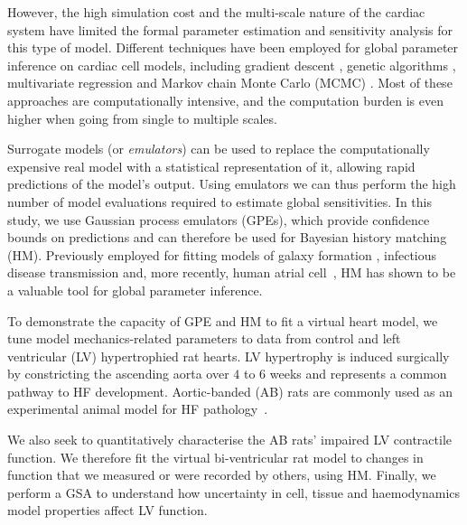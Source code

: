 However, the high simulation cost and the multi-scale nature of the cardiac system have limited the formal parameter estimation and sensitivity analysis for this type of model. Different techniques have been employed for global parameter inference on cardiac cell models, including gradient descent \cite{Dokos:2004}, genetic algorithms \cite{Groenendaal:2015}, multivariate regression \cite{Sarkar:2010} and Markov chain Monte Carlo (MCMC) \cite{Johnstone:2016}. Most of these approaches are computationally intensive, and the computation burden is even higher when going from single to multiple scales.

Surrogate models (or \textit{emulators}) can be used to replace the computationally expensive real model with a statistical representation of it, allowing rapid predictions of the model's output. Using emulators we can thus perform the high number of model evaluations required to estimate global sensitivities. In this study, we use Gaussian process emulators (GPEs), which provide confidence bounds on predictions and can therefore be used for Bayesian history matching (HM). Previously employed for fitting models of galaxy formation \cite{Vernon:2010}, infectious disease transmission \cite{Andrianakis:2015} and, more recently, human atrial cell~\cite{Coveney:2018}, HM has shown to be a valuable tool for global parameter inference.

To demonstrate the capacity of GPE and HM to fit a virtual heart model, we tune model mechanics-related parameters to data from control and left ventricular (LV) hypertrophied rat hearts. LV hypertrophy is induced surgically by constricting the ascending aorta over $4$ to $6$ weeks and represents a common pathway to HF development. Aortic-banded (AB) rats are commonly used as an experimental animal model for HF pathology~\cite{Camacho:2016}.

We also seek to quantitatively characterise the AB rats' impaired LV contractile function. We therefore fit the virtual bi-ventricular rat model to changes in function that we measured or were recorded by others, using HM. Finally, we perform a GSA to understand how uncertainty in cell, tissue and haemodynamics model properties affect LV function.



%
%
%
